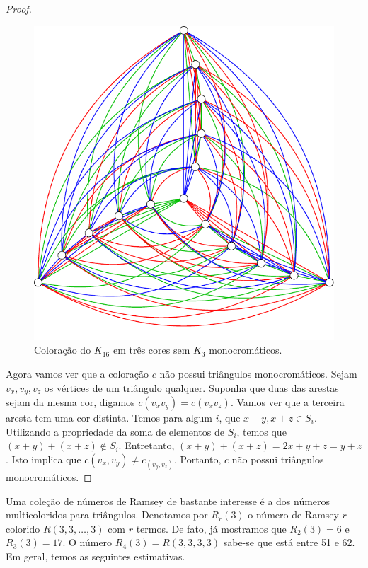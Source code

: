 \begin{proof}
\begin{figure}[ht!]
\centering
\includegraphics{figures/2_prelim_3_r333lb}
\caption{Coloração do $K_{16}$ em três cores sem $K_3$ monocromáticos.}
\label{prelim:fig:exr333}
\end{figure}

Agora vamos ver que a coloração $c$ não possui triângulos monocromáticos.
Sejam $v_x, v_y, v_z$ os vértices de um triângulo qualquer. Suponha que duas das arestas sejam da mesma cor, digamos $c(v_x v_y) = c(v_x v_z)$. Vamos ver que a terceira aresta tem uma cor distinta. Temos para algum $i$, que $x + y, x + z \in S_i$. Utilizando a propriedade da soma de elementos de $S_i$,
temos que $(x+y) + (x+z) \not\in S_i$. Entretanto, $(x+y) +(x+z) = 2x + y + z = y + z$. Isto implica que $c(v_x,v_y)\neq c_(v_y,v_z)$. Portanto, $c$ não possui triângulos monocromáticos.
\end{proof}

Uma coleção de números de Ramsey de bastante interesse é a dos números multicoloridos para triângulos. Denotamos por $R_r(3)$ o número de Ramsey $r$-colorido $R(3,3,\dots,3)$ com $r$ termos. De fato, já mostramos que $R_2(3) = 6$ e $R_3(3) = 17$. O número $R_4(3) = R(3,3,3,3)$ sabe-se que está entre 51 e 62. Em geral, temos as seguintes estimativas.

